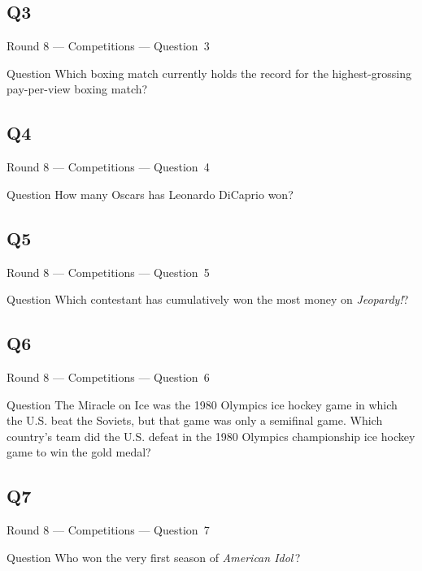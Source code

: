 \documentclass[11pt]{beamer}
\begin{document}
\subsection*{Q3}
\begin{frame}[t]{Round 8 --- Competitions --- \mbox{Question 3}}
\vspace{-0.5em}
\begin{block}{Question}
Which boxing match currently holds the record for the highest-grossing pay-per-view boxing match? 
\end{block}
\end{frame}
\subsection*{Q4}
\begin{frame}[t]{Round 8 --- Competitions --- \mbox{Question 4}}
\vspace{-0.5em}
\begin{block}{Question}
How many Oscars has Leonardo DiCaprio won?
\end{block}
\end{frame}
\subsection*{Q5}
\begin{frame}[t]{Round 8 --- Competitions --- \mbox{Question 5}}
\vspace{-0.5em}
\begin{block}{Question}
Which contestant has cumulatively won the most money on \emph{Jeopardy!}?
\end{block}
\end{frame}
\subsection*{Q6}
\begin{frame}[t]{Round 8 --- Competitions --- \mbox{Question 6}}
\vspace{-0.5em}
\begin{block}{Question}
The Miracle on Ice was the 1980 Olympics ice hockey game in which the U.S. beat the Soviets, but that game was only a semifinal game. Which country's team did the U.S. defeat in the 1980 Olympics championship ice hockey game to win the gold medal?
\end{block}
\end{frame}
\subsection*{Q7}
\begin{frame}[t]{Round 8 --- Competitions --- \mbox{Question 7}}
\vspace{-0.5em}
\begin{block}{Question}
Who won the very first season of \emph{American Idol}\,?
\end{block}
\end{frame}
\end{document}
